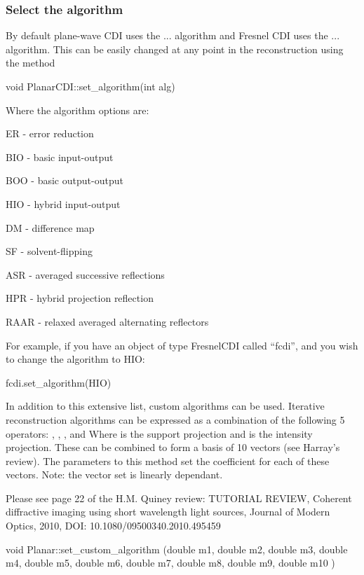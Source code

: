\documentclass[]{cxs-software}
\begin{document}
\subsubsection{Select the algorithm}

By default plane-wave CDI uses the ... algorithm and Fresnel CDI uses
the ... algorithm. This can be easily changed at any point in the
reconstruction using the method

\begin{myverbatim}
void PlanarCDI::set_algorithm(int alg) 	
\end{myverbatim}
Where the algorithm options are:
\begin{description} 
\item ER - error reduction 
\item BIO - basic input-output 
\item BOO - basic output-output 
\item HIO - hybrid input-output 
\item DM - difference map 
\item SF - solvent-flipping 
\item ASR - averaged successive reflections 
\item HPR - hybrid projection reflection 
\item RAAR - relaxed averaged alternating reflectors
\end{description}

For example, if you have an object of type FresnelCDI called ``fcdi'', and
you wish to change the algorithm to HIO:
\begin{myverbatim}
fcdi.set_algorithm(HIO) 	
\end{myverbatim}

In addition to this extensive list, custom algorithms can be
used. Iterative reconstruction algorithms can be expressed as a
combination of the following 5 operators: , , , and Where is the
support projection and is the intensity projection. These can be
combined to form a basis of 10 vectors (see Harray's review). The
parameters to this method set the coefficient for each of these
vectors. Note: the vector set is linearly dependant.

Please see page 22 of the H.M. Quiney review: TUTORIAL REVIEW,
Coherent diffractive imaging using short wavelength light sources,
Journal of Modern Optics, 2010, DOI: 10.1080/09500340.2010.495459

\begin{myverbatim}
void Planar::set_custom_algorithm (double m1,
double 	m2,
double 	m3,
double 	m4,
double 	m5,
double 	m6,
double 	m7,
double 	m8,
double 	m9,
double 	m10	 
)
\end{myverbatim}
			
\end{document}
